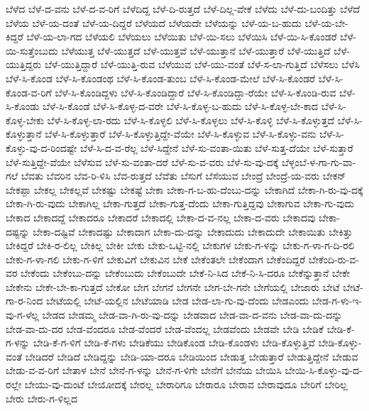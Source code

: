 {ಬೆಳೆದ
ಬೆಳೆ-ದ-ವನು
ಬೆಳೆ-ದ-ವ-ರಿಗೆ
ಬೆಳೆದಿದ್ದ
ಬೆಳೆ-ದಿ-ರುತ್ತದೆ
ಬೆಳೆ-ದಿಲ್ಲ-ವೇಕೆ
ಬೆಳೆದು
ಬೆಳೆ-ದು-ಬಂದಿತ್ತು
ಬೆಳೆದೆ
ಬೆಳೆಯ
ಬೆಳೆ-ಯ-ದಂತೆ
ಬೆಳೆ-ಯ-ದಿದ್ದರೆ
ಬೆಳೆಯದೆ
ಬೆಳೆಯದೇ
ಬೆಳೆಯನ್ನು
ಬೆಳೆ-ಯ-ಬ-ಹುದು
ಬೆಳೆ-ಯ-ಬೇ-ಕಿದ್ದರೆ
ಬೆಳೆ-ಯ-ಲಾ-ಗದ
ಬೆಳೆಯಲಿ
ಬೆಳೆಯಲು
ಬೆಳೆಯಿತು
ಬೆಳೆ-ಯಿ-ಸಲು
ಬೆಳೆಯಿಸಿ
ಬೆಳೆ-ಯಿ-ಸಿ-ಕೊಂಡರೆ
ಬೆಳೆ-ಯಿ-ಸುತ್ತೆಂಬುದು
ಬೆಳೆಯುತ್ತ
ಬೆಳೆ-ಯುತ್ತದೆ
ಬೆಳೆ-ಯುತ್ತವೆ
ಬೆಳೆ-ಯುತ್ತಾನೆ
ಬೆಳೆ-ಯುತ್ತಾರೆ
ಬೆಳೆ-ಯುತ್ತಿದೆ
ಬೆಳೆ-ಯುತ್ತಿದ್ದರು
ಬೆಳೆ-ಯುತ್ತಿದ್ದಾರೆ
ಬೆಳೆ-ಯುತ್ತಿ-ರುವ
ಬೆಳೆಯುವ
ಬೆಳೆ-ಯು-ವಂತೆ
ಬೆಳೆ-ಸ-ಲಾ-ಗುತ್ತಿದೆ
ಬೆಳೆಸಲು
ಬೆಳೆಸಿ
ಬೆಳೆ-ಸಿ-ಕೊಂಡ
ಬೆಳೆ-ಸಿ-ಕೊಂಡಂಥ
ಬೆಳೆ-ಸಿ-ಕೊಂಡ-ತುಂಬ
ಬೆಳೆ-ಸಿ-ಕೊಂಡ-ಮೇಲೆ
ಬೆಳೆ-ಸಿ-ಕೊಂಡರೆ
ಬೆಳೆ-ಸಿ-ಕೊಂಡ-ವ-ರಿಗೆ
ಬೆಳೆ-ಸಿ-ಕೊಂಡಿದ್ದಳು
ಬೆಳೆ-ಸಿ-ಕೊಂಡಿದ್ದಾರೆ
ಬೆಳೆ-ಸಿ-ಕೊಂಡಿದ್ದಾ-ರೆಯೇ
ಬೆಳೆ-ಸಿ-ಕೊಂಡಿ-ರುವ
ಬೆಳೆ-ಸಿ-ಕೊಂಡು
ಬೆಳೆ-ಸಿ-ಕೊಂಡೆ
ಬೆಳೆ-ಸಿ-ಕೊಳ್ಳ-ದ-ವರೇ
ಬೆಳೆ-ಸಿ-ಕೊಳ್ಳ-ಬ-ಹುದು
ಬೆಳೆ-ಸಿ-ಕೊಳ್ಳ-ಬೇ-ಕಾದ
ಬೆಳೆ-ಸಿ-ಕೊಳ್ಳ-ಬೇಕು
ಬೆಳೆ-ಸಿ-ಕೊಳ್ಳ-ಲಾ-ರದು
ಬೆಳೆ-ಸಿ-ಕೊಳ್ಳಲಿ
ಬೆಳೆ-ಸಿ-ಕೊಳ್ಳಲು
ಬೆಳೆ-ಸಿ-ಕೊಳ್ಳಿ
ಬೆಳೆ-ಸಿ-ಕೊಳ್ಳುತ್ತದೆ
ಬೆಳೆ-ಸಿ-ಕೊಳ್ಳುತ್ತಾನೆ
ಬೆಳೆ-ಸಿ-ಕೊಳ್ಳುತ್ತಾರೆ
ಬೆಳೆ-ಸಿ-ಕೊಳ್ಳುತ್ತಿದ್ದೇ-ವೆಯೇ
ಬೆಳೆ-ಸಿ-ಕೊಳ್ಳುವ
ಬೆಳೆ-ಸಿ-ಕೊಳ್ಳು-ವನು
ಬೆಳೆ-ಸಿ-ಕೊಳ್ಳು-ವು-ದ-ರಿಂದಷ್ಟೇ
ಬೆಳೆ-ಸಿ-ದ-ವ-ರೆಲ್ಲ
ಬೆಳೆ-ಸಿದ್ದೇನೆ
ಬೆಳೆ-ಸು-ವಂತಾ-ಯಿತು
ಬೆಳೆ-ಸುತ್ತ-ದೆಯೇ
ಬೆಳೆ-ಸುತ್ತಾರೆ
ಬೆಳೆ-ಸುತ್ತಿದ್ದೇ-ವೆಯೇ
ಬೆಳೆಸುವ
ಬೆಳೆ-ಸು-ವಂತಾ-ದರೆ
ಬೆಳೆ-ಸು-ವ-ವರು
ಬೆಳೆ-ಸು-ವು-ದಕ್ಕೆ
ಬೆಳ್ಳಂಬೆ-ಳ-ಗಾ-ಗು-ವಾ-ಗಲೆ
ಬೆವತು
ಬೆವರಿನ
ಬೆವ-ರಿ-ಳಿಸಿ
ಬೆವ-ರುತ್ತದೆ
ಬೆವೆತು
ಬೆಸುಗೆ
ಬೆಸೆಯುವ
ಬೇಂದ್ರೆ
ಬೇಂದ್ರೆ-ಯ-ವರು
ಬೇಕನ್
ಬೇಕಪ್ಪಾ
ಬೇಕಲ್ಲ
ಬೇಕಲ್ಲವೆ
ಬೇಕಷ್ಟು
ಬೇಕಷ್ಟೆ
ಬೇಕಾ
ಬೇಕಾ-ಗ-ಬ-ಹು-ದೆಂಬು-ದನ್ನು
ಬೇಕಾಗಿದೆ
ಬೇಕಾ-ಗಿ-ರು-ವು-ದಕ್ಕೆ
ಬೇಕಾ-ಗಿ-ರು-ವುದು
ಬೇಕಾಗಿಲ್ಲ
ಬೇಕಾ-ಗುತ್ತದೆ
ಬೇಕಾ-ಗುತ್ತ-ದೆಂದು
ಬೇಕಾ-ಗುತ್ತಿದ್ದವು
ಬೇಕಾಗುವ
ಬೇಕಾ-ಗು-ವುದು
ಬೇಕಾದ
ಬೇಕಾದದ್ದೆ
ಬೇಕಾದರೂ
ಬೇಕಾದರೆ
ಬೇಕಾದಲ್ಲಿ
ಬೇಕಾ-ದ-ವ-ನಲ್ಲ
ಬೇಕಾ-ದ-ವರು
ಬೇಕಾದವು
ಬೇಕಾ-ದಷ್ಟನ್ನು
ಬೇಕಾ-ದಷ್ಟಿವೆ
ಬೇಕಾದಷ್ಟು
ಬೇಕಾದಾಗ
ಬೇಕಾ-ದು-ದನ್ನು
ಬೇಕಾದುದು
ಬೇಕಾದುದೇ
ಬೇಕಾಯಿತು
ಬೇಕಿತ್ತು
ಬೇಕಿದ್ದರೆ
ಬೇಕಿ-ರ-ಲಿಲ್ಲ
ಬೇಕಿಲ್ಲ
ಬೇಕೀ
ಬೇಕು
ಬೇಕು-ಒಟ್ಟಿ-ನಲ್ಲಿ
ಬೇಕುಗಳ
ಬೇಕು-ಗ-ಳನ್ನು
ಬೇಕು-ಗ-ಳಾ-ಗ-ದಿ-ರಲಿ
ಬೇಕು-ಗ-ಳಾ-ಗಲಿ
ಬೇಕು-ಗ-ಳಿಗೆ
ಬೇಕುವಿಗೆ
ಬೇಕುವಿನ
ಬೇಕೆ
ಬೇಕೆಂತಲೇ
ಬೇಕೆಂದಾಗ
ಬೇಕೆಂದಿದ್ದರೆ
ಬೇಕೆಂದಿ-ರು-ವ-ವರ
ಬೇಕೆಂದು
ಬೇಕೆಂಬು-ದನ್ನು
ಬೇಕೆಂಬುದು
ಬೇಕೆಂಬುದೇ
ಬೇಕೆ-ನಿ-ಸಿದ
ಬೇಕೆ-ನಿ-ಸಿ-ದರೂ
ಬೇಕೆನ್ನುತ್ತಾನೆ
ಬೇಕೇ
ಬೇಕೇನು
ಬೇಕೇ-ಬೇ-ಕಾ-ಗುತ್ತದೆ
ಬೇಕೋ
ಬೇಗ
ಬೇಗನೆ
ಬೇಗನೇ
ಬೇಗ-ಬೇ-ಗನೇ
ಬೇಗೆಯಲ್ಲಿ
ಬೇಜಾರು
ಬೇಟೆ
ಬೇಟೆ-ಗಾ-ರ-ನಿಂದ
ಬೇಟೆಯಲ್ಲಿ
ಬೇಟೆ-ಯಲ್ಲಿನ
ಬೇಟೆಯಾಡಿ
ಬೇಡ
ಬೇಡ-ಲಾ-ಗು-ವು-ದೆಂದು
ಬೇಡಎಂದು
ಬೇಡ-ಗ-ಳು-ಇ-ವು-ಗ-ಳೆಲ್ಲ
ಬೇಡದ
ಬೇಡಮ್ಮ
ಬೇಡ-ವಾ-ಗಿ-ರು-ವು-ದನ್ನು
ಬೇಡವಾದ
ಬೇಡ-ವಾ-ದ-ವನು
ಬೇಡ-ವಾ-ದು-ದನ್ನು
ಬೇಡ-ವಾ-ದು-ದರ
ಬೇಡ-ವೆಂದರೂ
ಬೇಡ-ವೆಂದರೆ
ಬೇಡ-ವೆಂದಲ್ಲ
ಬೇಡವೆಂದು
ಬೇಡವೇ
ಬೇಡಿ
ಬೇಡಿಕೆ
ಬೇಡಿ-ಕೆ-ಗ-ಳನ್ನು
ಬೇಡಿ-ಕೆ-ಗ-ಳಿಗೆ
ಬೇಡಿ-ಕೆ-ಗಳು
ಬೇಡಿಕೆಯು
ಬೇಡಿಕೊಂಡ
ಬೇಡಿ-ಕೊಂಡಳು
ಬೇಡಿ-ಕೊಳ್ಳುತ್ತಿವೆ
ಬೇಡಿ-ಕೊಳ್ಳು-ವಂತೆ
ಬೇಡಿದರೆ
ಬೇಡಿದೆ
ಬೇಡಿದ್ದನ್ನು
ಬೇಡಿ-ಯಾ-ದರೂ
ಬೇಡಿಯಿಂದ
ಬೇಡುತ್ತ
ಬೇಡುತ್ತಾರೆ
ಬೇಡುತ್ತಿದ್ದೇನೆ
ಬೇಡುವ
ಬೇಡು-ವ-ವ-ರಿಗೆ
ಬೇತಾಳ
ಬೇನೆ
ಬೇನೆ-ಗ-ಳನ್ನು
ಬೇನೆ-ಗ-ಳಿಗೇ
ಬೇನೆಗೆ
ಬೇನೆಯ
ಬೇಯಿಸಿ
ಬೇಯಿ-ಸಿ-ಕೊಳ್ಳು-ವು-ದ-ರಲ್ಲೇ
ಬೇಯು-ವು-ದುಂಟೆ
ಬೇಯೋದಕ್ಕೆ
ಬೇರಲ್ಲ
ಬೇರಾರಿಗೂ
ಬೇರಾರೂ
ಬೇರಾವ
ಬೇರಾವುದೂ
ಬೇರಿಗೆ
ಬೇರಿಲ್ಲ
ಬೇರು
ಬೇರು-ಗ-ಳಿಲ್ಲದ
}
